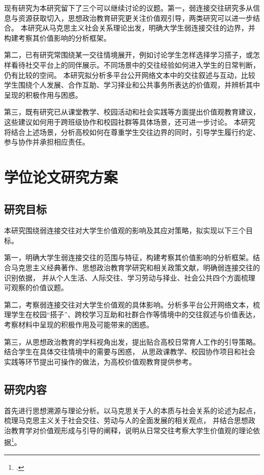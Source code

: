 现有研究为本研究留下了三个可以继续讨论的议题。第一，弱连接交往研究多从信息与资源获取切入，思想政治教育研究更关注价值观引导，两类研究可以进一步结合。
本研究从马克思主义社会关系理论出发，明确大学生弱连接交往的边界，并构建考察其价值影响的分析框架。

第二，已有研究常围绕某一交往情境展开，例如讨论学生怎样选择学习搭子，或怎样看待社交平台上的同伴展示。不同场景中的交往经验如何进入学生的日常判断，仍有比较的空间。
本研究拟分析多平台公开网络文本中的交往叙述与互动，比较学生围绕个人发展、合作互助、学习择业和公共事务所表达的价值观，并辨析其中呈现的积极作用与困惑。

第三，既有研究已从课堂教学、校园活动和社会实践等方面提出价值观教育建议，这些建议如何用于跨班级协作和校园社群等具体场景，还可进一步讨论。
本研究将结合上述场景，分析高校如何在尊重学生交往边界的同时，引导学生履行约定、参与协作并承担相应责任。

\section{学位论文研究方案}

\subsection{研究目标}

本研究围绕弱连接交往对大学生价值观的影响及其应对策略，拟实现以下三个目标。

第一，明确大学生弱连接交往的范围与特征，构建考察其价值影响的分析框架。结合马克思主义经典著作、思想政治教育学研究和相关政策文献，明确弱连接交往的识别依据，
并从个人生活、人际交往、学习劳动与择业、社会公共四个方面梳理可观察的价值议题。

第二，考察弱连接交往对大学生价值观的具体影响。分析多平台公开网络文本，梳理学生在校园“搭子”、跨校学习互助和社群合作等情境中的交往叙述与价值表达，
考察材料中呈现的积极作用及可能带来的困惑。

第三，从思想政治教育的学科视角出发，提出贴合高校日常育人工作的引导策略。结合学生在具体交往情境中的需要与困惑，
从思政课教学、校园协作项目和社会实践等环节提出可操作的做法，为高校价值观教育提供参考。

\subsection{研究内容}

首先进行思想溯源与理论分析。以马克思关于人的本质与社会关系的论述为起点，梳理马克思主义关于社会交往、劳动与人的全面发展的相关观点，
并结合思想政治教育学对价值观形成与引导的阐释，说明从日常交往考察大学生价值观的理论依据\footcite{MarxEngels2009,sizheng2018}。

